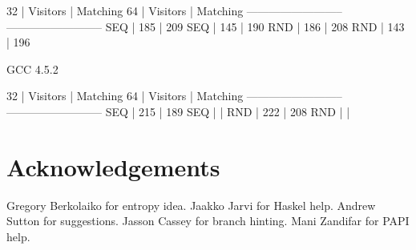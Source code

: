 \documentclass[submission,copyright]{eptcs}
\begin{document}
 32 | Visitors | Matching      64 | Visitors | Matching 
--------------------------    --------------------------
SEQ |   185    |   209        SEQ |   145    |   190    
RND |   186    |   208        RND |   143    |   196    

GCC 4.5.2

 32 | Visitors | Matching      64 | Visitors | Matching 
--------------------------    --------------------------
SEQ |   215    |   189        SEQ |          |          
RND |   222    |   208        RND |          |          

\section{Acknowledgements} %

Gregory Berkolaiko for entropy idea. Jaakko Jarvi for Haskel help. Andrew Sutton 
for suggestions. Jasson Cassey for branch hinting. Mani Zandifar for PAPI help.



\end{document}

